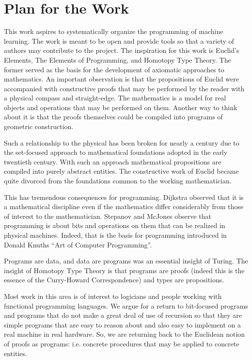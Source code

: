 \chapter{Plan for the Work}

This work aspires to systematically organize the programming of
machine learning.  The work is meant to be open and provide tools so
that a variety of authors may contribute to the project.  The
inspiration for this work is Euclid's Elements, The Elements of
Programming, and Homotopy Type Theory.  The former served as the basis
for the development of axiomatic approaches to mathematics.  An
important observation is that the propositions of Euclid were
accompanied with constructive proofs that may be performed by the
reader with a physical compass and straight-edge.  The mathematics is
a model for real objects and operations that may be performed on them.  Another way to think about it
is that the proofs themselves could be compiled into programs of geometric construction.

Such a relationship to the physical has been broken for nearly a
century due to the set-focused approach to mathematical foundations
adopted in the early twentieth century.  With such an approach
mathematical propositions are compiled into purely abstract
entities.  The constructive work of Euclid became quite divorced
from the foundations common to the working mathematician.

This has tremendous consequences for programming.  Dijkstra observed that it is a mathematical discipline
even if the mathematics differ considerably from those of interest to the mathematician.  Stepanov and McJones
observe that programming is about bits and operations on them that can be realized in physical machines.  Indeed, that is the
basis for programming introduced in Donald Knuths ``Art of Computer Programming''.  

Programs are data, and data are programs was an essential insight of Turing.  The insight of Homotopy Type Theory
is that programs are proofs (indeed this is the essence of the Curry-Howard Correspondence)
and types are propositions.  

Most work in this area is of interest to logicians and people working with functional programming languages.
We argue for a return to bit-focused programs and programs that do not make a great deal of use of recursion so that they
are simple programs that are easy to reason about and also easy to implement on a real machine in real hardware.  So, we are
returning back to the Euclidean notion of proofs as programs: i.e. concrete procedures that may be applied to concrete entities.



